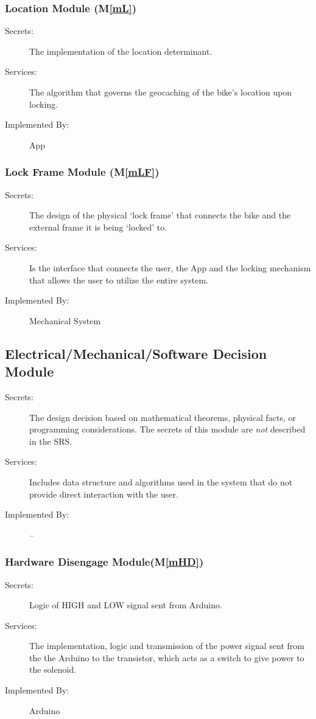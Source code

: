 \documentclass[12pt, titlepage]{article}
\newcommand{\mref}[1]{M\ref{#1}}
\begin{document}
\subsubsection{Location Module (\mref{mL})}
\begin{description}
\item[Secrets:]The implementation of the location determinant.
\item[Services:]The algorithm that governs the geocaching of the bike’s location upon locking.
\item[Implemented By:]App
\end{description}

\subsubsection{Lock Frame Module (\mref{mLF})}
\begin{description}
\item[Secrets:]The design of the physical ‘lock frame’ that connects the bike and the external frame it is being ‘locked’ to.
\item[Services:]Is the interface that connects the user, the App and the locking mechanism that allows the user to utilize the entire system.
\item[Implemented By:]Mechanical System
\end{description}

\subsection{Electrical/Mechanical/Software Decision Module}

\begin{description}
\item[Secrets:] The design decision based on mathematical theorems, physical
  facts, or programming considerations. The secrets of this module are
  \emph{not} described in the SRS.
\item[Services:] Includes data structure and algorithms used in the system that
  do not provide direct interaction with the user. 
\item[Implemented By:] --
\end{description}

\subsubsection{Hardware Disengage Module(\mref{mHD})}
\begin{description}
\item[Secrets:] Logic of HIGH and LOW signal sent from Arduino.
\item[Services:]The implementation, logic and transmission of the power signal sent from the 
the Arduino to the transistor, which acts as a switch to give power to the solenoid. 
\item[Implemented By:]Arduino
\end{description}
\end{document}
